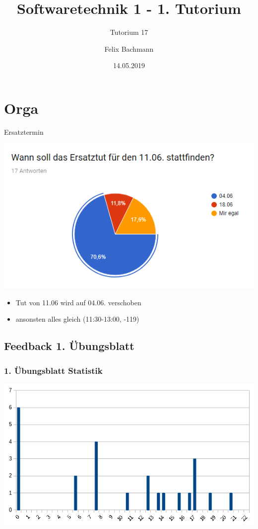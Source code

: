 \documentclass[18pt]{beamer}
\title[SWT1]{Softwaretechnik 1 - 1. Tutorium}
\subtitle{Tutorium 17}
\author{Felix Bachmann}
\date{14.05.2019}
\institute{KIT - Institut für Programmstrukturen und Datenorganisation (IPD)}
\begin{document}
	



\begin{frame}
\titlepage
\end{frame}

\section{Orga}

	\begin{frame}{Ersatztermin}

	\centering
	\includegraphics[scale=0.7]{pics/tut1/poll.png}
		\begin{itemize}
		\item Tut von 11.06 wird auf 04.06. verschoben
		\item ansonsten alles gleich (11:30-13:00, -119) 
	\end{itemize}
\end{frame}


	\subsection{Feedback 1. Übungsblatt}
	\begin{frame}
		\frametitle{1. Übungsblatt Statistik}
		\includegraphics[scale=0.7]{./pics/tut1/statistics_ub1.png}
	\end{frame}
	
\end{document}

